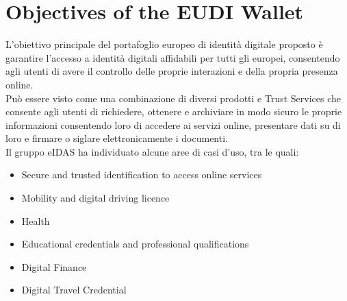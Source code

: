 \section{Objectives of the EUDI Wallet}
L'obiettivo principale del portafoglio europeo di identità digitale proposto è garantire l'accesso a identità digitali affidabili per tutti gli europei, consentendo agli utenti di avere il controllo delle proprie interazioni e della propria presenza online.\\
Può essere visto come una combinazione di diversi prodotti e Trust Services che consente agli utenti di richiedere, ottenere e archiviare in modo sicuro le proprie informazioni consentendo loro di accedere ai servizi online, presentare dati su di loro e firmare o siglare elettronicamente i documenti.\\
Il gruppo eIDAS ha individuato alcune aree di casi d'uso, tra le quali:
\begin{itemize}
    \item Secure and trusted identification to access online services
    \item Mobility and digital driving licence
    \item Health
    \item Educational credentials and professional qualifications
    \item Digital Finance
    \item Digital Travel Credential
\end{itemize}
